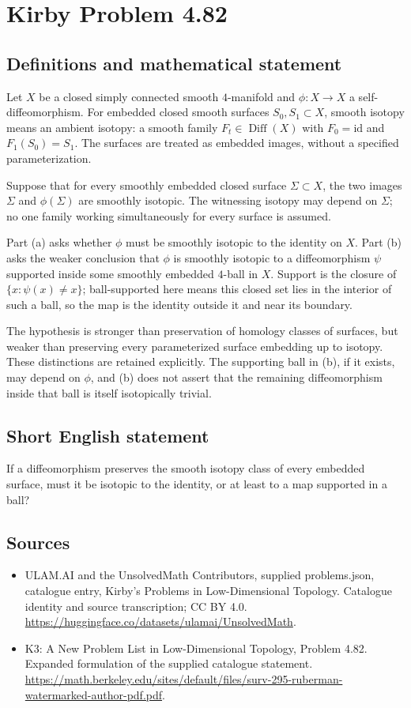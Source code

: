 \documentclass[11pt,a4paper]{article}
\begin{document}
\section*{Kirby Problem 4.82}\label{statement}

\subsection{Definitions and mathematical statement}
Let $X$ be a closed simply connected smooth $4$-manifold and
$\phi:X\to X$ a self-diffeomorphism. For embedded closed smooth
surfaces $S_0,S_1\subset X$, smooth isotopy means an ambient
isotopy: a smooth family $F_t\in\operatorname{Diff}(X)$ with
$F_0=\mathrm{id}$ and $F_1(S_0)=S_1$.
The surfaces are treated as embedded images, without a specified
parameterization.

Suppose that for every smoothly embedded closed surface
$\Sigma\subset X$, the two images $\Sigma$ and $\phi(\Sigma)$
are smoothly isotopic. The witnessing isotopy may depend on
$\Sigma$; no one family working simultaneously for every surface
is assumed.

Part (a) asks whether $\phi$ must be smoothly isotopic to the
identity on $X$. Part (b) asks the weaker conclusion that $\phi$
is smoothly isotopic to a diffeomorphism $\psi$ supported inside
some smoothly embedded $4$-ball in $X$. Support is the closure
of $\{x:\psi(x)\ne x\}$; ball-supported here means this closed
set lies in the interior of such a ball, so the map is the
identity outside it and near its boundary.

The hypothesis is stronger than preservation of homology classes
of surfaces, but weaker than preserving every parameterized surface
embedding up to isotopy. These distinctions are retained explicitly.
The supporting ball in (b), if it exists, may depend on $\phi$,
and (b) does not assert that the remaining diffeomorphism inside
that ball is itself isotopically trivial.
\subsection{Short English statement}
If a diffeomorphism preserves the smooth isotopy class of every embedded surface, must it be isotopic to the identity, or at least to a map supported in a ball?
\subsection{Sources}
\begin{itemize}
\item[S1] ULAM.AI and the UnsolvedMath Contributors, supplied problems.json, catalogue entry, Kirby's Problems in Low-Dimensional Topology. Catalogue identity and source transcription; CC BY 4.0.
\url{https://huggingface.co/datasets/ulamai/UnsolvedMath}.
\item[S2] K3: A New Problem List in Low-Dimensional Topology, Problem 4.82. Expanded formulation of the supplied catalogue statement.
\url{https://math.berkeley.edu/sites/default/files/surv-295-ruberman-watermarked-author-pdf.pdf}.
\end{itemize}
\end{document}
